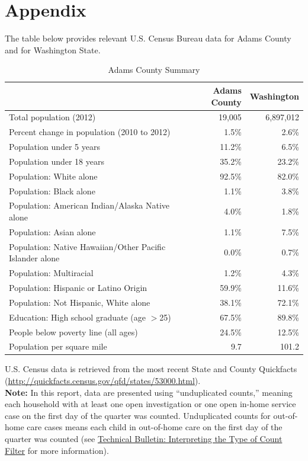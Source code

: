 \documentclass{article}\usepackage[]{graphicx}\usepackage[]{color}
\begin{document}
\vspace{-18pt}

\newpage

\section{Appendix}

The table below provides relevant U.S. Census Bureau data for Adams County and for Washington State. 
\nopagebreak[3]
\begin{table}[ht]
\centering
\caption{Adams County Summary} 
\begin{tabular}{lrr}
  \toprule
 & Adams County & Washington \\ 
  \midrule
Total population (2012) & 19,005 & 6,897,012 \\ 
  Percent change in population (2010 to 2012) & 1.5\% & 2.6\% \\ 
  Population under 5 years & 11.2\% & 6.5\% \\ 
  Population under 18 years & 35.2\% & 23.2\% \\ 
  Population: White alone & 92.5\% & 82.0\% \\ 
  Population: Black alone & 1.1\% & 3.8\% \\ 
  Population: American Indian/Alaska Native alone & 4.0\% & 1.8\% \\ 
  Population: Asian alone & 1.1\% & 7.5\% \\ 
  Population: Native Hawaiian/Other Pacific Islander alone & 0.0\% & 0.7\% \\ 
  Population: Multiracial & 1.2\% & 4.3\% \\ 
  Population: Hispanic or Latino Origin & 59.9\% & 11.6\% \\ 
  Population: Not Hispanic, White alone & 38.1\% & 72.1\% \\ 
  Education: High school graduate (age $>$25) & 67.5\% & 89.8\% \\ 
  People below poverty line (all ages) & 24.5\% & 12.5\% \\ 
  Population per square mile & 9.7 & 101.2 \\ 
   \bottomrule
\end{tabular}
\end{table}



U.S. Census data is retrieved from the most recent State and County Quickfacts (\href{http://quickfacts.census.gov/qfd/states/53000.html}{http://quickfacts.census.gov/qfd/states/53000.html}).\\

\textbf{Note:} In this report, data are presented using ``unduplicated counts,'' meaning each household with at least one open investigation or one open in-home service case on the first day of the quarter was counted. Unduplicated counts for out-of-home care cases means each child in out-of-home care on the first day of the quarter was counted (see \href{http://http://www.partnersforourchildren.org/publications/using-different-count-types-data-portal}{Technical Bulletin: Interpreting the Type of Count Filter} for more information).  
\end{document}
